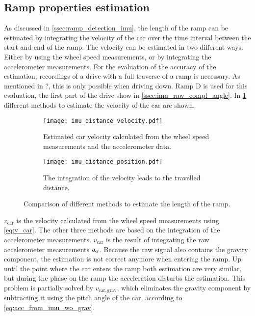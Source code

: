 \subsection{Ramp properties estimation}
As discussed in \cref{ssec:ramp_detection_imu}, the length of the ramp can be estimated by integrating the velocity of the car over the time interval between the start and end of the ramp.
The velocity can be estimated in two different ways.
Either by using the wheel speed measurements, or by integrating the accelerometer measurements.
For the evaluation of the accuracy of the estimation, recordings of a drive with a full traverse of a ramp is necessary.
As mentioned in ?, this is only possible when driving down.
Ramp D is used for this evaluation, the first part of the drive show in \cref{ssec:imu_raw_compl_angle}.
In \cref{fig:imu_distance_velocity} different methods to estimate the velocity of the car are shown.
\begin{figure}[htb]
	\centering
	\begin{subfigure}{1\textwidth}
		\centering
		\texttt{[image: imu\_distance\_velocity.pdf]}
		\caption{Estimated car velocity calculated from the wheel speed measurements and the accelerometer data.}
		\label{fig:imu_distance_velocity}
	\end{subfigure}
	
	\begin{subfigure}{1\textwidth}
		\centering
		\texttt{[image: imu\_distance\_position.pdf]}
		\caption{The integration of the velocity leads to the travelled distance.}
		\label{fig:imu_distance_position}
	\end{subfigure}
	\caption{Comparison of different methods to estimate the length of the ramp.}
\end{figure}
$v_\mathrm{car}$ is the velocity calculated from the wheel speed measurements using \cref{eq:v_car}.
The other three methods are based on the integration of the accelerometer measurements.
$v_\mathrm{car}$ is the result of integrating the raw accelerometer measurements $\vb{a}_x$.
Because the raw signal also contains the gravity component, the estimation is not correct anymore when entering the ramp.
Up until the point where the car enters the ramp both estimation are very similar, but during the phase on the ramp the acceleration disturbs the estimation.
This problem is partially solved by $v_\mathrm{car, grav}$, which eliminates the gravity component by subtracting it using the pitch angle of the car, according to \cref{eq:acc_from_imu_wo_grav}.
